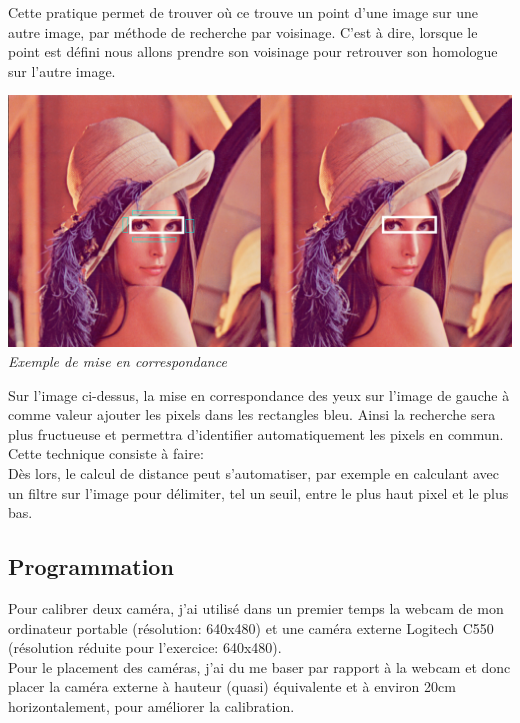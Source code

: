 \documentclass[12pt, french]{report}
\begin{document}
Cette pratique permet de trouver où ce trouve un point d'une image sur une autre image, par méthode de recherche par voisinage. C'est à dire, lorsque le point est défini nous allons prendre son voisinage pour retrouver son homologue sur l'autre image.

\begin{center}
    \includegraphics[width=\textwidth]{Images/Vision/Registration.PNG}\\
    \textit{Exemple de mise en correspondance}\\
\end{center}

Sur l'image ci-dessus, la mise en correspondance des yeux sur l'image de gauche à comme valeur ajouter les pixels dans les rectangles bleu. Ainsi la recherche sera plus fructueuse et permettra d'identifier automatiquement les pixels en commun.\\

Cette technique consiste à faire: \\

Dès lors, le calcul de distance peut s'automatiser, par exemple en calculant avec un filtre sur l'image pour délimiter, tel un seuil, entre le plus haut pixel et le plus bas.


\subsection{Programmation}

Pour calibrer deux caméra, j'ai utilisé dans un premier temps la webcam de mon ordinateur portable (résolution: 640x480) et une caméra externe Logitech C550 (résolution réduite pour l'exercice: 640x480).\\

Pour le placement des caméras, j'ai du me baser par rapport à la webcam et donc placer la caméra externe à hauteur (quasi) équivalente et à environ 20cm horizontalement, pour améliorer la calibration.\\
\end{document}
